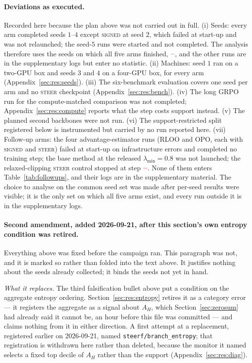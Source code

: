 \documentclass[11pt]{article}
\newcommand{\AH}{A_{H}}
\providecommand{\PENDING}{\textcolor{red}{\textbf{--}}}
\newcommand{\num}[1]{\ifcsname #1\endcsname\csname #1\endcsname\else\PENDING\fi}
\begin{document}
\paragraph{Deviations as executed.} Recorded here because the plan above was
not carried out in full. (i) Seeds: every arm completed seeds $1$--$4$ except
\textsc{signed} at seed $2$, which failed at start-up and was not relaunched; the seed-$5$
runs were started and not completed. The analysis therefore uses the seeds on which
all five arms finished, $\num{Seedset}$, and the other runs are in the supplementary
logs but enter
no statistic. (ii) Machines: seed $1$ ran on a two-GPU box and seeds $3$ and $4$ on a
four-GPU box, for every arm (Appendix~\ref{sec:res:seeds}). (iii) The six-benchmark
evaluation covers one seed per arm and no \textsc{steer} checkpoint
(Appendix~\ref{sec:res:bench}). (iv) The long GRPO run for the compute-matched
comparison was not completed; Appendix~\ref{sec:res:compute} reports what the step
costs support instead. (v) The planned second backbones were not run. (vi) The
support-restricted split registered below is instrumented but carried by no run
reported here. (vii) Follow-up arms: the four advantage-estimator runs (RLOO and
OPO, each with \textsc{signed} and \textsc{steer}) failed at start-up on infrastructure
errors and completed no training step; the base method at the released
$\lambda_{\min} = 0.8$ was not launched; the relaxed-clipping \textsc{steer} control
stopped at step $\num{Rxclipsteerlaststep}$. None of them enters
Table~\ref{tab:followups}, and their logs are in the supplementary material. The choice to analyse on the common seed set was made after
per-seed results were visible; it is the only set on which all five arms exist, and
every run outside it is in the supplementary logs.

\paragraph{Second amendment, added 2026-09-21, after this section's own entropy
condition was retired.} Everything above was fixed before the campaign ran. This
paragraph was not, and it is marked so rather than folded into the text above. It
justifies nothing about the seeds already collected; it binds the seeds not yet in
hand.

\emph{What it replaces.} The third falsification bullet above put a condition on the
aggregate entropy ordering. Section~\ref{sec:res:entropy} retires it as a category
error --- it registers the aggregate as a signal about $\AH$, which
Section~\ref{sec:zerosum} had already said it cannot be, an hour before this file was
committed --- and claims nothing from it in either direction. A first attempt at a
replacement, registered earlier on 2026-09-21, named
\texttt{steerf/branch\_entropy}; that registration is withdrawn here rather than
deleted, because the monitor it named selects a fixed top decile of $\AH$ rather than
the support (Appendix~\ref{sec:res:diag}).
\end{document}
